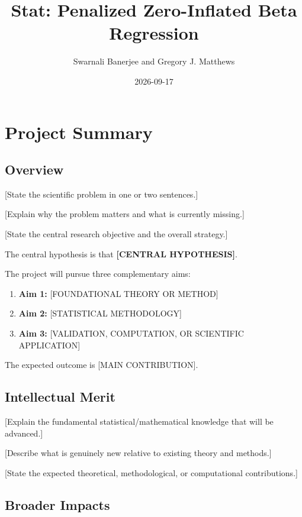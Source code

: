 \documentclass[
  11pt,
  letterpaper,
]{article}
\title{Stat: Penalized Zero-Inflated Beta Regression}
\author{Swarnali Banerjee and Gregory J. Matthews}
\date{2026-09-17}
\providecommand{\tightlist}{%
  \setlength{\itemsep}{0pt}\setlength{\parskip}{0pt}}\usepackage{longtable,booktabs,array}
\begin{document}
\maketitle


\section{Project Summary}\label{project-summary}

\subsection{Overview}\label{overview}

{[}State the scientific problem in one or two sentences.{]}

{[}Explain why the problem matters and what is currently missing.{]}

{[}State the central research objective and the overall strategy.{]}

The central hypothesis is that \textbf{{[}CENTRAL HYPOTHESIS{]}}.

The project will pursue three complementary aims:

\begin{enumerate}
\def\labelenumi{\arabic{enumi}.}
\tightlist
\item
  \textbf{Aim 1:} {[}FOUNDATIONAL THEORY OR METHOD{]}
\item
  \textbf{Aim 2:} {[}STATISTICAL METHODOLOGY{]}
\item
  \textbf{Aim 3:} {[}VALIDATION, COMPUTATION, OR SCIENTIFIC
  APPLICATION{]}
\end{enumerate}

The expected outcome is {[}MAIN CONTRIBUTION{]}.

\subsection{Intellectual Merit}\label{intellectual-merit}

{[}Explain the fundamental statistical/mathematical knowledge that will
be advanced.{]}

{[}Describe what is genuinely new relative to existing theory and
methods.{]}

{[}State the expected theoretical, methodological, or computational
contributions.{]}

\subsection{Broader Impacts}\label{broader-impacts}
\end{document}
